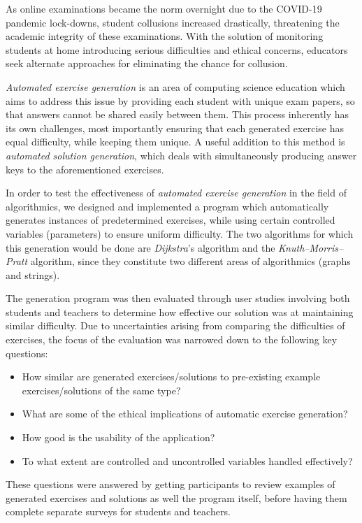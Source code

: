 \documentclass{l4proj}
\begin{document}
As online examinations became the norm overnight due to the COVID-19 pandemic lock-downs, student collusions increased drastically, threatening the academic integrity of these examinations. With the solution of monitoring students at home introducing serious difficulties and ethical concerns, educators seek alternate approaches for eliminating the chance for collusion.

\emph{Automated exercise generation} is an area of computing science education which aims to address this issue by providing each student with unique exam papers, so that answers cannot be shared easily between them. This process inherently has its own challenges, most importantly ensuring that each generated exercise has equal difficulty, while keeping them unique. A useful addition to this method is \emph{automated solution generation}, which deals with simultaneously producing answer keys to the aforementioned exercises.

In order to test the effectiveness of \emph{automated exercise generation} in the field of algorithmics, we designed and implemented a program which automatically generates instances of predetermined exercises, while using certain controlled variables (parameters) to ensure uniform difficulty. The two algorithms for which this generation would be done are \emph{Dijkstra}'s algorithm and the \emph{Knuth–Morris–Pratt} algorithm, since they constitute two different areas of algorithmics (graphs and strings).

The generation program was then evaluated through user studies involving both students and teachers to determine how effective our solution was at maintaining similar difficulty. Due to uncertainties arising from comparing the difficulties of exercises, the focus of the evaluation was narrowed down to the following key questions:

\begin{itemize}
	\item
	How similar are generated exercises/solutions to pre-existing example exercises/solutions of the same type?
	\item
	What are some of the ethical implications of automatic exercise generation?
	\item
	How good is the usability of the application?
	\item
	To what extent are controlled and uncontrolled variables handled effectively?
\end{itemize}

These questions were answered by getting participants to review examples of generated exercises and solutions as well the program itself, before having them complete separate surveys for students and teachers. 
\end{document}
